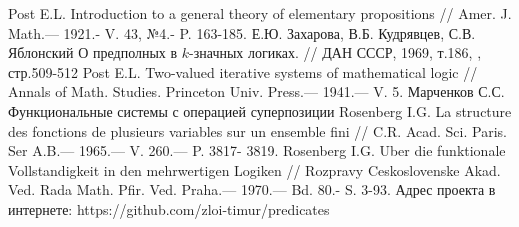 \documentclass[a4paper,14pt]{extreport}
\begin{document}
\newpage
{}
\begin{thebibliography}{9}
	Post E.L. Introduction to a general theory of elementary propositions // 
Amer. J. Math.— 1921.- V. 43, №4.- P. 163-185. 
 Е.Ю. Захарова, В.Б. Кудрявцев, С.В. Яблонский О предполных в $k$-значных логиках. // ДАН СССР, 1969, т.186, , стр.509-512 
	Post E.L. Two-valued iterative systems of mathematical logic // Annals of 
Math. Studies. Princeton Univ. Press.— 1941.— V. 5. 
 Марченков С.С. Функциональные системы с операцией суперпозиции
	Rosenberg I.G. La structure des fonctions de plusieurs variables sur un ensemble fini // C.R. Acad. Sci. Paris. Ser A.B.— 1965.— V. 260.— P. 3817- 3819. 
	Rosenberg I.G. Uber die funktionale Vollstandigkeit in den mehrwertigen Logiken // Rozpravy Ceskoslovenske Akad. Ved. Rada Math. Pfir. Ved. Praha.— 1970.— Bd. 80.- S. 3-93. 
 Адрес проекта в интернете: https://github.com/zloi-timur/predicates 


\end{thebibliography}
\end{document}
